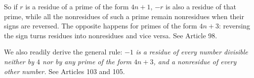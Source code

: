 So if $r$ is a residue of a prime of the form $4n+1$, $-r$ is also a residue of that prime, while all the nonresidues of such a prime remain nonresidues when their signs are reversed. The opposite happens for primes of the form $4n+3$: reversing the sign turns residues into nonresidues and vice versa. See Article 98.

We also readily derive the general rule: $-1$ \emph{is a residue of every number divisible neither by $4$ nor by any prime of the form $4n+3$, and a nonresidue of every other number.} See Articles 103 and 105.
